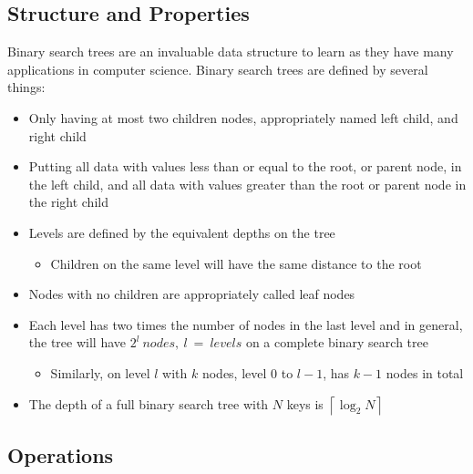 \documentclass[hidelinks,11pt]{article}
\begin{document}
\subsection{Structure and Properties}
Binary search trees are an invaluable data structure to learn as they have many applications in computer science. Binary search trees are defined by several things:
\begin{itemize}
    \item Only having at most two children nodes, appropriately named left child, and right child
    \item Putting all data with values less than or equal to the root, or parent node, in the left child, and all data with values greater than the root or parent node in the right child
    \item Levels are defined by the equivalent depths on the tree
    \begin{itemize}
        \item Children on the same level will have the same distance to the root
    \end{itemize}
    \item Nodes with no children are appropriately called leaf nodes
    \item Each level has two times the number of nodes in the last level and in general, the tree will have $2^l\ nodes,\ l\ =\ levels$ on a complete binary search tree
    \begin{itemize}
        \item Similarly, on level $l$ with $k$ nodes, level $0$ to $l-1$, has $k-1$ nodes in total
    \end{itemize}
    \item The depth of a full binary search tree with $N$ keys is $\left \lceil{\log_2 N}\right \rceil $
\end{itemize}
\subsection{Operations}
\end{document}
